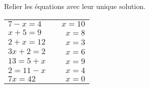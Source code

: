 Relier les équations avec leur unique solution.
\begin{center}
\begin{tabularx}{0.5\linewidth}{lXr}
    $7-x=4$ && $x=10$ \\
    $x+5=9$ && $x=8$ \\ 
    $2+x=12$ && $x=3$ \\
    $3x+2=2$ && $x=6$ \\
    $13=5+x$ && $x=9$ \\
    $2=11-x$ && $x=4$ \\
    $7x=42$ && $x=0$
\end{tabularx}
\end{center}